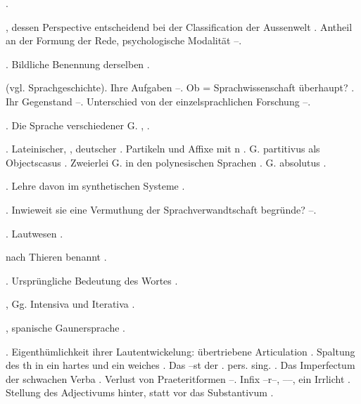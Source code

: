 \begin{register}
 \pageref{sp.307}.

, dessen Perspective entscheidend bei der Classification der Aussenwelt \pageref{sp.307}.  Antheil an der Formung der Rede, psychologische Modalität \pageref{sp.472}–\pageref{sp.474}.

. Bildliche Benennung derselben \pageref{sp.43}.


 (vgl. Sprachgeschichte). Ihre Aufgaben \pageref{sp.9}–\pageref{sp.10}. Ob = Sprachwissenschaft überhaupt? \pageref{sp.11}. Ihr Gegenstand \pageref{sp.135}–\pageref{sp.146}. Unterschied von der einzelsprachlichen Forschung \pageref{sp.138}–\pageref{sp.142}.

. Die Sprache verschiedener G. \pageref{sp.258}, \pageref{sp.284}.

  \pageref{sp.101}. Lateinischer, , deutscher \pageref{sp.115}. Partikeln und Affixe mit n \pageref{sp.153}. G. partitivus als Objectscasus \pageref{sp.462}. Zweierlei G. in den polynesischen Sprachen \pageref{sp.463}. G. absolutus \pageref{sp.467}.

. Lehre davon im synthetischen Systeme \pageref{sp.101}.

. Inwieweit sie eine Vermuthung der Sprachverwandtschaft begründe? \pageref{sp.146}–\pageref{sp.147}.

. Lautwesen \pageref{sp.34}.

 nach Thieren benannt \pageref{sp.41}.

. Ursprüngliche Bedeutung des Wortes \pageref{sp.229}.

, Gg. Intensiva und Iterativa \pageref{sp.481}.

, spanische Gaunersprache \pageref{sp.288}.

.  Eigenthümlichkeit ihrer Lautentwickelung: übertriebene Articulation \pageref{sp.183}.  Spaltung des th in ein hartes und ein weiches \pageref{sp.190}. Das –st der \pageref{sp.2}. pers. sing. \pageref{sp.203}. Das Imperfectum der schwachen Verba \pageref{sp.241}. Verlust von Praeteritformen \pageref{sp.253}–\pageref{sp.254}. Infix –r–, –\pageref{sp.1}–, ein Irrlicht \pageref{sp.292}. Stellung des Adjectivums hinter, statt vor das Substantivum \pageref{sp.457}.


\end{register}
